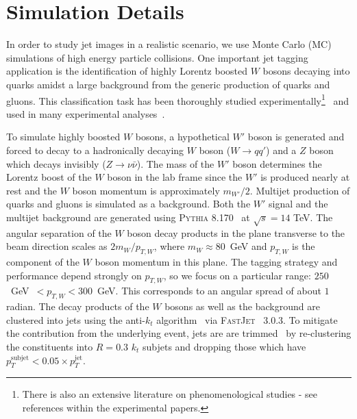 \section{Simulation Details}
\label{sec:simulation}

In order to study jet images in a realistic scenario, we use Monte Carlo (MC) simulations of high energy particle collisions. One important jet tagging application is the identification of highly Lorentz boosted $W$ bosons decaying into quarks amidst a large background from the generic production of quarks and gluons.  This classification task has been thoroughly studied experimentally\footnote{There is also an extensive literature on phenomenological studies - see references within the experimental papers.}~\cite{Khachatryan:2014vla,ATL-PHYS-PUB-2015-033,ATL-PHYS-PUB-2014-004} and used in many experimental analyses~\cite{Aad:2015owa,Khachatryan:2014hpa,Khachatryan:2015mta,Khachatryan:2015oba,Khachatryan:2015gza,Khachatryan:2015bma,Khachatryan:2015cwa,Khachatryan:2015ywa,Aad:2014wea,Aad:2015agg,Aad:2015kna,Aad:2015ufa,Aad:2014haa}.  

To simulate highly boosted $W$ bosons, a hypothetical $W'$ boson is generated and forced to decay to a hadronically decaying $W$ boson ($W\rightarrow qq'$) and a $Z$ boson which decays invisibly ($Z\rightarrow \nu\bar{\nu}$).  The mass of the $W'$ boson determines the Lorentz boost of the $W$ boson in the lab frame since the $W'$ is produced nearly at rest and the $W$ boson momentum is approximately $m_{W'}/2$.  Multijet production of quarks and gluons is simulated as a background.  Both the $W'$ signal and the multijet background are generated using \textsc{Pythia} 8.170~\cite{Pythia8,Pythia} at $\sqrt{s}=14$ TeV.  The angular separation of the $W$ boson decay products in the plane transverse to the beam direction scales as $2m_{W}/p_{T,W}$, where $m_W\approx 80$~GeV and $p_{T,W}$ is the component of the $W$ boson momentum in this plane.  The tagging strategy and performance depend strongly on $p_{T,W}$, so we focus on a particular range: $250$~GeV~$<p_{T,W}<300$~GeV.  This corresponds to an angular spread of about $1$ radian.  The decay products of the $W$ bosons as well as the background are clustered into jets using the anti-$k_t$ algorithm~\cite{antiktpaper} via \textsc{FastJet}~\cite{fastjet} 3.0.3.  To mitigate the contribution from the underlying event, jets are are trimmed~\cite{trimming} by re-clustering the constituents into $R=0.3$ $k_t$ subjets and dropping those which have $p_T^\text{subjet}<0.05\times p_T^\text{jet}$. 

